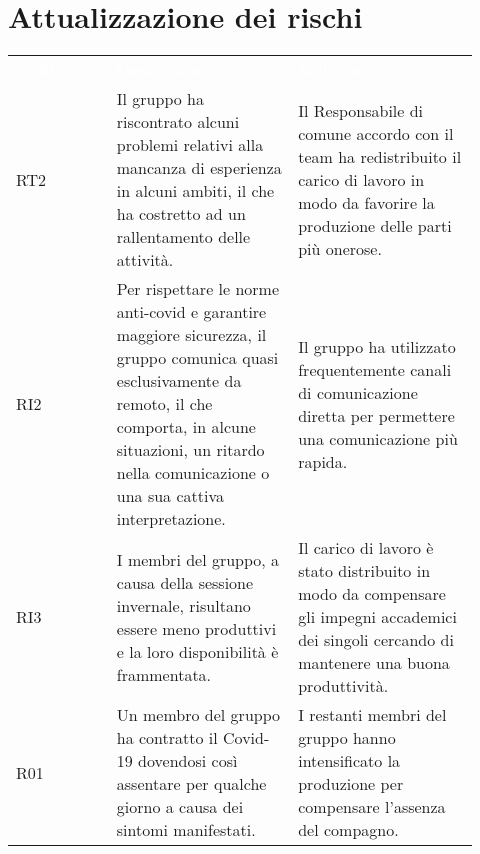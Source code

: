\section{Attualizzazione dei rischi}
\label{sec:AttualizzazioneRischi}

{\renewcommand{\arraystretch}{1.5} \small
\begin{tabular}{ >{\centering}p{0.20\linewidth} | >{\centering}p{0.36\linewidth} | >{\centering}p{0.36\linewidth}}
	\rowcolor[RGB]{33, 73, 50}
	\textcolor{white}{\textbf{Codice}} & \textcolor{white}
	{\textbf{Descrizione}} & \textcolor{white}{\textbf{Soluzione}}\tabularnewline
	\rowcolor[RGB]{216, 235, 171}
	RT2
    & Il gruppo ha riscontrato alcuni problemi relativi alla mancanza di esperienza in alcuni ambiti, il che ha costretto ad un rallentamento delle attività.  
    & Il Responsabile di comune accordo con il team ha redistribuito il carico di lavoro in modo da favorire la produzione delle parti più onerose. \tabularnewline
    \rowcolor[RGB]{233, 245, 206}
	RI2
    & Per rispettare le norme anti-covid e garantire maggiore sicurezza, il gruppo comunica quasi esclusivamente da remoto, il che comporta, in alcune situazioni, un ritardo nella comunicazione o una sua cattiva interpretazione.
    & Il gruppo ha utilizzato frequentemente canali di comunicazione diretta per permettere una comunicazione più rapida. \tabularnewline
    \rowcolor[RGB]{216, 235, 171}
    RI3
	& I membri del gruppo, a causa della sessione invernale, risultano essere meno produttivi e la loro disponibilità è frammentata. 
    & Il carico di lavoro è stato distribuito in modo da compensare gli impegni accademici dei singoli cercando di mantenere una buona produttività. \tabularnewline
	\rowcolor[RGB]{233, 245, 206}
    R01
	& Un membro del gruppo ha contratto il Covid-19 dovendosi così assentare per qualche giorno a causa dei sintomi manifestati.
    & I restanti membri del gruppo hanno intensificato la produzione per compensare l'assenza del compagno.   \tabularnewline
\end{tabular}	
}